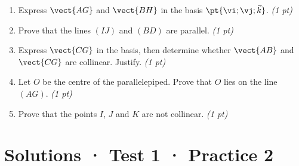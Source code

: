 \begin{enumerate}

\item Express $\vect{AG}$ and $\vect{BH}$ in the basis $\pt{\vi;\vj;\vec k}$. \hfill\textit{(1 pt)}

\item Prove that the lines $(IJ)$ and $(BD)$ are parallel. \hfill\textit{(1 pt)}

\item Express $\vect{CG}$ in the basis, then determine whether $\vect{AB}$ and $\vect{CG}$ are collinear. Justify. \hfill\textit{(1 pt)}

\item Let $O$ be the centre of the parallelepiped. Prove that $O$ lies on the line $(AG)$. \hfill\textit{(1 pt)}

\item Prove that the points $I$, $J$ and $K$ are not collinear. \hfill\textit{(1 pt)}

\end{enumerate}

\ifmxteacher\mxnewpage

\section*{Solutions · Test 1 · Practice 2}\label{cor:1-2}

